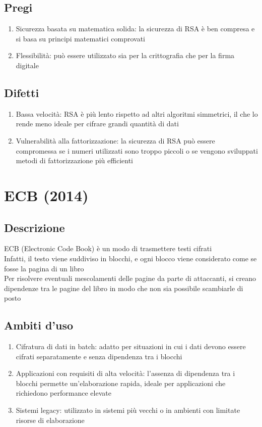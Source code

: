 \documentclass[10pt,oneside,a4paper]{article}
\begin{document}
\subsection{Pregi}
\begin{enumerate}
\item Sicurezza basata su matematica solida: la sicurezza di RSA è ben compresa e si basa su principi matematici comprovati
\item Flessibilità: può essere utilizzato sia per la crittografia che per la firma digitale
\end{enumerate}
\subsection{Difetti}
\begin{enumerate}
\item Bassa velocità: RSA è più lento rispetto ad altri algoritmi simmetrici, il che lo rende meno ideale per cifrare grandi quantità di dati
\item Vulnerabilità alla fattorizzazione: la sicurezza di RSA può essere compromessa se i numeri utilizzati sono troppo piccoli o se vengono sviluppati metodi di fattorizzazione più efficienti
\end{enumerate}
\section{ECB (2014)}
\subsection{Descrizione}
ECB (Electronic Code Book) è un modo di trasmettere testi cifrati\\
Infatti, il testo viene suddiviso in blocchi, e ogni blocco viene considerato come se fosse la pagina di un libro\\
Per risolvere eventuali mescolamenti delle pagine da parte di attaccanti, si creano dipendenze tra le pagine del libro in modo che non sia possibile scambiarle di posto
\subsection{Ambiti d'uso}
\begin{enumerate}
\item Cifratura di dati in batch: adatto per situazioni in cui i dati devono essere cifrati separatamente e senza dipendenza tra i blocchi
\item Applicazioni con requisiti di alta velocità: l'assenza di dipendenza tra i blocchi permette un'elaborazione rapida, ideale per applicazioni che richiedono performance elevate
\item Sistemi legacy: utilizzato in sistemi più vecchi o in ambienti con limitate risorse di elaborazione
\end{enumerate}
\end{document}
